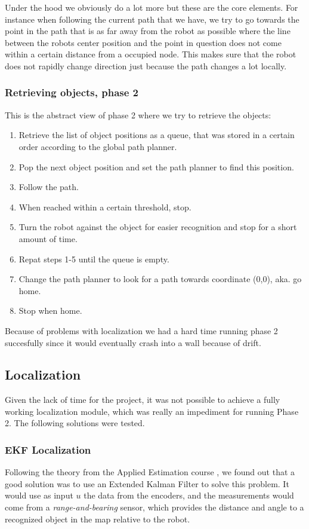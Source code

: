 Under the hood we obviously do a lot more but these are the core elements. For instance when following the current path that we have, we try to go towards the point in the path that is as far away from the robot as possible where the line between the robots center position and the point in question does not come within a certain distance from a occupied node. This makes sure that the robot does not rapidly change direction just because the path changes a lot locally. 

\subsubsection{Retrieving objects, phase 2}

This is the abstract view of phase 2 where we try to retrieve the objects:

\begin{enumerate}
\item Retrieve the list of object positions as a queue, that was stored in a certain order according to the global path planner.
\item Pop the next object position and set the path planner to find this position.
\item Follow the path.
\item When reached within a certain threshold, stop.
\item Turn the robot against the object for easier recognition and stop for a short amount of time.
\item Repat steps 1-5 until the queue is empty.
\item Change the path planner to look for a path towards coordinate (0,0), aka. go home.
\item Stop when home.
\end{enumerate}

Because of problems with localization we had a hard time running phase 2 succesfully since it would eventually crash into a wall because of drift.

\subsection{Localization}
Given the lack of time for the project, it was not possible to achieve a fully working localization module, which was really an impediment for running Phase 2. The following solutions were tested.

\subsubsection{EKF Localization}
Following the theory from the Applied Estimation course \cite{Applied}, we found out that a good solution was to use an Extended Kalman Filter \cite{Thrun} to solve this problem. It would use as input $u$ the data from the encoders, and the measurements would come from a \emph{range-and-bearing} sensor, which provides the distance and angle to a recognized object in the map relative to the robot.

